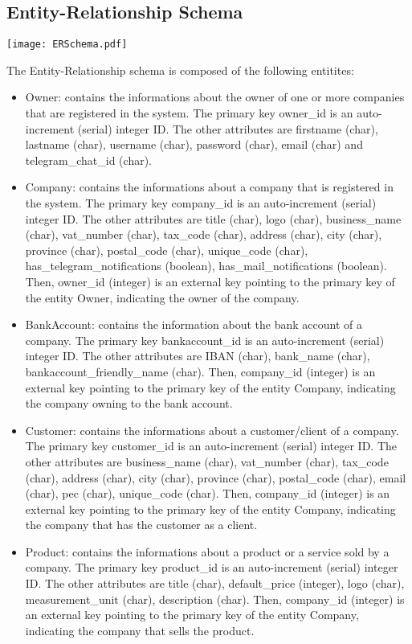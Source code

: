 \subsection{Entity-Relationship Schema}

\texttt{[image: ERSchema.pdf]}



The Entity-Relationship schema is composed of the following entitites:
\begin{itemize}
 	\item Owner: contains the informations about the owner of one or more companies that are registered in the system. The primary key owner\_id is an auto-increment (serial) integer ID. The other attributes are firstname (char), lastname (char), username (char), password (char), email (char) and telegram\_chat\_id (char).
	\item Company: contains the informations about a company that is registered in the system. The primary key company\_id is an auto-increment (serial) integer ID. The other attributes are title (char), logo (char), business\_name (char), vat\_number (char), tax\_code (char), address (char), city (char), province (char), postal\_code (char), unique\_code (char), has\_telegram\_notifications (boolean), has\_mail\_notifications (boolean). Then, owner\_id (integer) is an external key pointing to the primary key of the entity Owner, indicating the owner of the company.
	\item BankAccount: contains the information about the bank account of a company. The primary key bankaccount\_id is an auto-increment (serial) integer ID. The other attributes are IBAN (char), bank\_name (char), bankaccount\_friendly\_name (char). Then, company\_id (integer) is an external key pointing to the primary key of the entity Company, indicating the company owning to the bank account.
   	\item Customer: contains the informations about a customer/client of a company. The primary key customer\_id is an auto-increment (serial) integer ID. The other attributes are business\_name (char), vat\_number (char), tax\_code (char), address (char), city (char), province (char), postal\_code (char), email (char), pec (char), unique\_code (char). Then, company\_id (integer) is an external key pointing to the primary key of the entity Company, indicating the company that has the customer as a client.
   	\item Product: contains the informations about a product or a service sold by a company. The primary key product\_id is an auto-increment (serial) integer ID. The other attributes are title (char), default\_price (integer), logo (char), measurement\_unit (char), description (char). Then, company\_id (integer) is an external key pointing to the primary key of the entity Company, indicating the company that sells the product.

\end{itemize}

